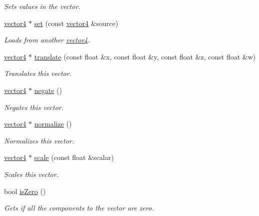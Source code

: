\begin{DoxyCompactItemize}
\begin{DoxyCompactList}\small\item\em Sets values in the vector. \end{DoxyCompactList}\item 
\hyperlink{classflounder_1_1vector4}{vector4} $\ast$ \hyperlink{classflounder_1_1vector4_a57a89cbc720c8d7c439d915fddf03048}{set} (const \hyperlink{classflounder_1_1vector4}{vector4} \&source)
\begin{DoxyCompactList}\small\item\em Loads from another \hyperlink{classflounder_1_1vector4}{vector4}. \end{DoxyCompactList}\item 
\hyperlink{classflounder_1_1vector4}{vector4} $\ast$ \hyperlink{classflounder_1_1vector4_a3aa7c17918a15e289b0ae6b77a4cb27d}{translate} (const float \&x, const float \&y, const float \&z, const float \&w)
\begin{DoxyCompactList}\small\item\em Translates this vector. \end{DoxyCompactList}\item 
\hyperlink{classflounder_1_1vector4}{vector4} $\ast$ \hyperlink{classflounder_1_1vector4_a024aa43916f5c77623010019e31c5791}{negate} ()
\begin{DoxyCompactList}\small\item\em Negates this vector. \end{DoxyCompactList}\item 
\hyperlink{classflounder_1_1vector4}{vector4} $\ast$ \hyperlink{classflounder_1_1vector4_aa9eec0ab63428f78de24ac90f2a20206}{normalize} ()
\begin{DoxyCompactList}\small\item\em Normalizes this vector. \end{DoxyCompactList}\item 
\hyperlink{classflounder_1_1vector4}{vector4} $\ast$ \hyperlink{classflounder_1_1vector4_af31ae2dc6c068dd8ca5f831418e61d0f}{scale} (const float \&scalar)
\begin{DoxyCompactList}\small\item\em Scales this vector. \end{DoxyCompactList}\item 
bool \hyperlink{classflounder_1_1vector4_a5671fd3884e240a005b1e870040b17ed}{is\+Zero} ()
\begin{DoxyCompactList}\small\item\em Gets if all the components to the vector are zero. \end{DoxyCompactList}\item 

\end{DoxyCompactItemize}
